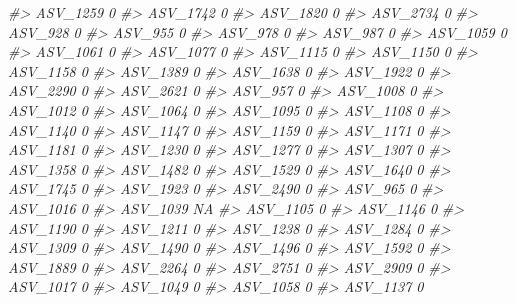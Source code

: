 \documentclass[
]{article}
\newenvironment{Shaded}{\begin{snugshade}}{\end{snugshade}}
\newcommand{\CommentTok}[1]{\textcolor[rgb]{0.56,0.35,0.01}{\textit{#1}}}
\begin{document}
\begin{Shaded}
\begin{Highlighting}[]
\CommentTok{\#\textgreater{} ASV\_1259  0}
\CommentTok{\#\textgreater{} ASV\_1742  0}
\CommentTok{\#\textgreater{} ASV\_1820  0}
\CommentTok{\#\textgreater{} ASV\_2734  0}
\CommentTok{\#\textgreater{} ASV\_928   0}
\CommentTok{\#\textgreater{} ASV\_955   0}
\CommentTok{\#\textgreater{} ASV\_978   0}
\CommentTok{\#\textgreater{} ASV\_987   0}
\CommentTok{\#\textgreater{} ASV\_1059  0}
\CommentTok{\#\textgreater{} ASV\_1061  0}
\CommentTok{\#\textgreater{} ASV\_1077  0}
\CommentTok{\#\textgreater{} ASV\_1115  0}
\CommentTok{\#\textgreater{} ASV\_1150  0}
\CommentTok{\#\textgreater{} ASV\_1158  0}
\CommentTok{\#\textgreater{} ASV\_1389  0}
\CommentTok{\#\textgreater{} ASV\_1638  0}
\CommentTok{\#\textgreater{} ASV\_1922  0}
\CommentTok{\#\textgreater{} ASV\_2290  0}
\CommentTok{\#\textgreater{} ASV\_2621  0}
\CommentTok{\#\textgreater{} ASV\_957   0}
\CommentTok{\#\textgreater{} ASV\_1008  0}
\CommentTok{\#\textgreater{} ASV\_1012  0}
\CommentTok{\#\textgreater{} ASV\_1064  0}
\CommentTok{\#\textgreater{} ASV\_1095  0}
\CommentTok{\#\textgreater{} ASV\_1108  0}
\CommentTok{\#\textgreater{} ASV\_1140  0}
\CommentTok{\#\textgreater{} ASV\_1147  0}
\CommentTok{\#\textgreater{} ASV\_1159  0}
\CommentTok{\#\textgreater{} ASV\_1171  0}
\CommentTok{\#\textgreater{} ASV\_1181  0}
\CommentTok{\#\textgreater{} ASV\_1230  0}
\CommentTok{\#\textgreater{} ASV\_1277  0}
\CommentTok{\#\textgreater{} ASV\_1307  0}
\CommentTok{\#\textgreater{} ASV\_1358  0}
\CommentTok{\#\textgreater{} ASV\_1482  0}
\CommentTok{\#\textgreater{} ASV\_1529  0}
\CommentTok{\#\textgreater{} ASV\_1640  0}
\CommentTok{\#\textgreater{} ASV\_1745  0}
\CommentTok{\#\textgreater{} ASV\_1923  0}
\CommentTok{\#\textgreater{} ASV\_2490  0}
\CommentTok{\#\textgreater{} ASV\_965   0}
\CommentTok{\#\textgreater{} ASV\_1016  0}
\CommentTok{\#\textgreater{} ASV\_1039 NA}
\CommentTok{\#\textgreater{} ASV\_1105  0}
\CommentTok{\#\textgreater{} ASV\_1146  0}
\CommentTok{\#\textgreater{} ASV\_1190  0}
\CommentTok{\#\textgreater{} ASV\_1211  0}
\CommentTok{\#\textgreater{} ASV\_1238  0}
\CommentTok{\#\textgreater{} ASV\_1284  0}
\CommentTok{\#\textgreater{} ASV\_1309  0}
\CommentTok{\#\textgreater{} ASV\_1490  0}
\CommentTok{\#\textgreater{} ASV\_1496  0}
\CommentTok{\#\textgreater{} ASV\_1592  0}
\CommentTok{\#\textgreater{} ASV\_1889  0}
\CommentTok{\#\textgreater{} ASV\_2264  0}
\CommentTok{\#\textgreater{} ASV\_2751  0}
\CommentTok{\#\textgreater{} ASV\_2909  0}
\CommentTok{\#\textgreater{} ASV\_1017  0}
\CommentTok{\#\textgreater{} ASV\_1049  0}
\CommentTok{\#\textgreater{} ASV\_1058  0}
\CommentTok{\#\textgreater{} ASV\_1137  0}

\end{Highlighting}
\end{Shaded}
\end{document}
